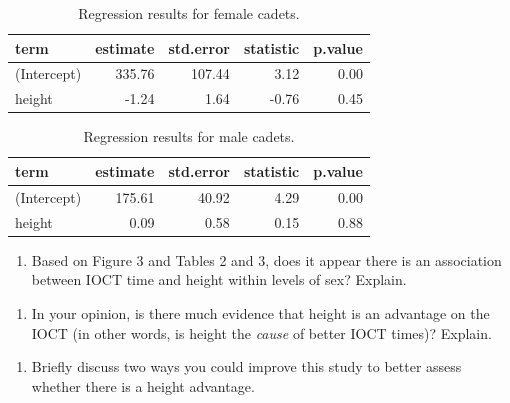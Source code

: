 \documentclass[
]{book}
\providecommand{\tightlist}{%
  \setlength{\itemsep}{0pt}\setlength{\parskip}{0pt}}
\begin{document}
\begin{table}

\caption{\label{tab:unnamed-chunk-5}Regression results for female cadets.}
\centering
\begin{tabular}[t]{l|r|r|r|r}
\hline
term & estimate & std.error & statistic & p.value\\
\hline
(Intercept) & 335.76 & 107.44 & 3.12 & 0.00\\
\hline
height & -1.24 & 1.64 & -0.76 & 0.45\\
\hline
\end{tabular}
\end{table}

\begin{table}

\caption{\label{tab:unnamed-chunk-5}Regression results for male cadets.}
\centering
\begin{tabular}[t]{l|r|r|r|r}
\hline
term & estimate & std.error & statistic & p.value\\
\hline
(Intercept) & 175.61 & 40.92 & 4.29 & 0.00\\
\hline
height & 0.09 & 0.58 & 0.15 & 0.88\\
\hline
\end{tabular}
\end{table}

\begin{enumerate}
\def\labelenumi{\arabic{enumi}.}
\setcounter{enumi}{13}
\tightlist
\item
  Based on Figure 3 and Tables 2 and 3, does it appear there is an association between IOCT time and height within levels of sex? Explain.
\end{enumerate}

\vspace{1in}

\newpage

\begin{enumerate}
\def\labelenumi{\arabic{enumi}.}
\setcounter{enumi}{14}
\tightlist
\item
  In your opinion, is there much evidence that height is an advantage on the IOCT (in other words, is height the \emph{cause} of better IOCT times)? Explain.
\end{enumerate}

\vspace{2in}

\begin{enumerate}
\def\labelenumi{\arabic{enumi}.}
\setcounter{enumi}{15}
\tightlist
\item
  Briefly discuss two ways you could improve this study to better assess whether there is a height advantage.
\end{enumerate}
\end{document}

